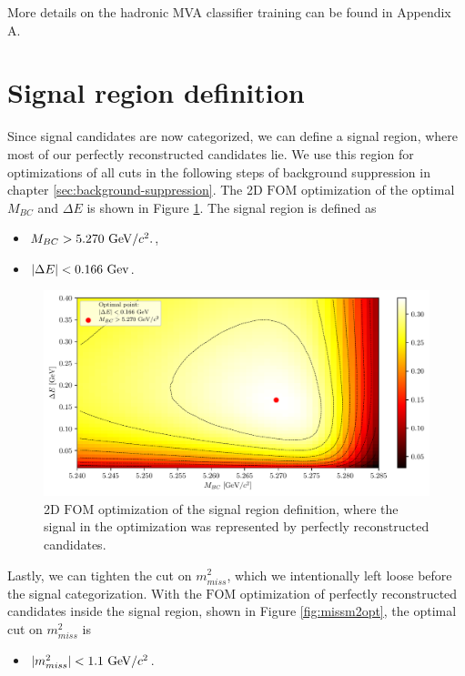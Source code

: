 More details on the hadronic MVA classifier training can be found in Appendix A.

\section{Signal region definition}

Since signal candidates are now categorized, we can define a signal region, where most of our perfectly reconstructed candidates lie. We use this region for optimizations of all cuts in the following steps of background suppression in chapter \ref{sec:background-suppression}. The 2D $\mathrm{FOM}$ optimization of the optimal $M_{BC}$ and $\Delta E$ is shown in Figure \ref{fig:sigwin}.
The signal region is defined as
\begin{itemize}
\item $M_{BC} > 5.270\mathrm{~GeV}/c^2.$,
\item $\vert \Delta E \vert < 0.166\mathrm{~Gev}$. 
\end{itemize}

\begin{figure}[H]
\centering
\captionsetup{width=0.8\linewidth}
\includegraphics[width=\linewidth]{fig/sigWin}
\caption{2D $\mathrm{FOM}$ optimization of the signal region definition, where the signal in the optimization was represented by perfectly reconstructed candidates.}
\label{fig:sigwin}
\end{figure}

Lastly, we can tighten the cut on $m_{miss}^2$, which we intentionally left loose before the signal categorization. With the $\mathrm{FOM}$ optimization of perfectly reconstructed candidates inside the signal region, shown in Figure \ref{fig:missm2opt}, the optimal cut on $m_{miss}^2$ is 

\begin{itemize}
\item $\vert m_{miss}^2 \vert < 1.1\mathrm{~GeV}/c^2$.
\end{itemize}

